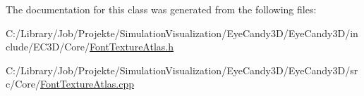 The documentation for this class was generated from the following files\+:\begin{DoxyCompactItemize}
\item 
C\+:/\+Library/\+Job/\+Projekte/\+Simulation\+Visualization/\+Eye\+Candy3\+D/\+Eye\+Candy3\+D/include/\+E\+C3\+D/\+Core/\mbox{\hyperlink{_font_texture_atlas_8h}{Font\+Texture\+Atlas.\+h}}\item 
C\+:/\+Library/\+Job/\+Projekte/\+Simulation\+Visualization/\+Eye\+Candy3\+D/\+Eye\+Candy3\+D/src/\+Core/\mbox{\hyperlink{_font_texture_atlas_8cpp}{Font\+Texture\+Atlas.\+cpp}}\end{DoxyCompactItemize}
